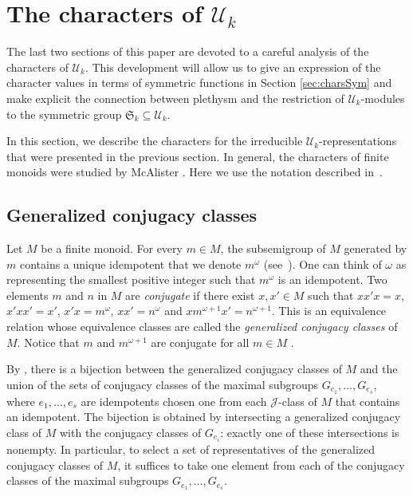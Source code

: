 \documentclass[10pt]{amsart}
\theoremstyle{definition}
\theoremstyle{remark}
\newcommand{\defncolor}{\color{darkred}}
\newcommand{\defn}[1]{{\defncolor\emph{#1}}} %
\begin{document}
\section{The characters of $\mathcal{U}_k$}
\label{section.characters}
The last two sections of this paper are devoted to a careful analysis of the
characters of $\mathcal{U}_k$.  This development will allow
us to give an expression of the character values in terms of symmetric
functions in Section \ref{sec:charsSym} and make explicit the connection between
plethysm and the restriction of $\mathcal{U}_k$-modules to the symmetric
group $\mathfrak{S}_k \subseteq \mathcal{U}_k$.

In this section, we describe the characters for the irreducible
$\mathcal{U}_k$-representations that were presented in the previous section.
In general, the characters of finite monoids were studied by McAlister \cite{McAlister}.
Here we use the notation described in~\cite[Chapter 7]{Steinberg.2016}.

\subsection{Generalized conjugacy classes}
Let $M$ be a finite monoid. For every $m \in M$, the subsemigroup of $M$ generated
by $m$ contains a unique idempotent that we denote \defn{$m^\omega$} (see~\cite[Corollary 1.2]{Steinberg.2016}). One
can think of $\omega$ as representing the smallest positive integer such that $m^\omega$ is an idempotent.
Two elements $m$ and $n$ in $M$ are \defn{conjugate} if there exist $x, x' \in M$ such that
$xx'x = x$, $x'xx' = x'$, $x'x = m^{\omega}$,
$xx' = n^{\omega}$ and $x m^{\omega +1}x' = n^{\omega +1}$.
This is an equivalence relation whose equivalence classes are called the
\defn{generalized conjugacy classes} of $M$.
Notice that $m$ and $m^{\omega + 1}$ are conjugate for all $m\in M$
\cite[Chapter 7]{Steinberg.2016}.

By \cite[Proposition~7.4]{Steinberg.2016},
there is a bijection between the generalized conjugacy classes of $M$
and the union of the sets of conjugacy classes of the maximal subgroups
$G_{e_1}, \ldots, G_{e_s}$, where $e_1, \ldots, e_s$ are idempotents chosen
one from each $\mathscr{J}$-class of $M$ that contains an idempotent.
The bijection is obtained by intersecting a generalized conjugacy
class of $M$ with the conjugacy classes of $G_{e_i}$: exactly one of these
intersections is nonempty.
In particular, to select a set of representatives of the generalized conjugacy
classes of $M$, it suffices to take one element from each of the conjugacy
classes of the maximal subgroups $G_{e_1}, \ldots, G_{e_s}$.
\end{document}
